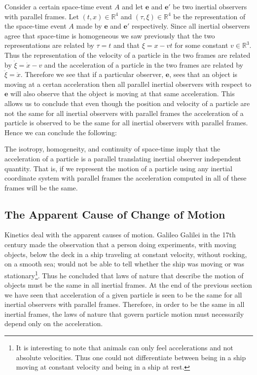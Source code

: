 \documentclass[graybox,envcountchap,sectrefs]{svmonoMuga}
\begin{document}
Consider a certain space-time event $A$ and let $\mathbf{e}$ and $\mathbf{e}'$ be two inertial observers with parallel frames. Let $(t,x)\in \mathbb{R}^4$ and $(\tau,\xi)\in \mathbb{R}^4$ be the representation of the space-time event $A$ made by 
$\mathbf{e}$ and $\mathbf{e}'$ respectively. Since all inertial observers agree that space-time is homogeneous we saw previously that the two representations are related by $\tau=t$ and that
$\xi=x-vt$ for some constant $v\in \mathbb{R}^3$. Thus the representation of the velocity of a particle in the two frames are related by 
$\dot{\xi}=\dot{x}-v$ and the acceleration of a particle in the two frames are related by $\ddot{\xi}=\ddot{x}$.
Therefore we see that if a particular observer, $\mathbf{e}$, sees that an object is moving at a certan acceleration then all parallel inertial observers with respect to $\mathbf{e}$ will also observe that the object is moving at that same acceleration. This allows us to conclude that even though the position and velocity of a particle are not the same for all inertial observers with parallel frames the acceleration of a particle is observed to be the same for all inertial observers with parallel frames. Hence we can conclude the following:
\begin{svgraybox}
The isotropy, homogeneity, and continuity of space-time imply that the acceleration of a particle is a parallel translating inertial observer independent quantity. That is, if we represent the motion of a particle using any inertial coordinate system with parallel frames the acceleration computed in all of these frames will be the same.
\end{svgraybox}






\subsection{The Apparent Cause of Change of Motion}\label{Secn:Kinetics}

Kinetics deal with the apparent causes of motion. Galileo Galilei in the 17th century made the observation that a person doing experiments, with moving objects, below the deck in a ship traveling at 
constant velocity, without rocking, on a smooth sea;  would not be able to tell whether the ship was moving or was stationary\footnote{It is interesting to note that animals can only feel accelerations and not absolute velocities. Thus one could not differentiate between being in a ship moving at constant 
velocity and being in a ship at rest.}. Thus he concluded that laws of nature that describe the 
motion of objects must be the same in all inertial frames.  At the end of the previous section we have seen that acceleration of a given particle is seen to be the same for all inertial observers with parallel frames.
Therefore, in order to be the same in all inertial frames, the laws of nature that govern particle motion must necessarily depend only on the acceleration. 
\end{document}

